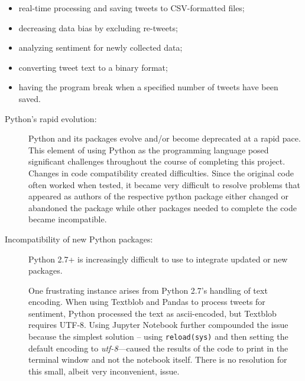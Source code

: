 \begin{itemize}	
\item real-time processing and saving tweets to CSV-formatted files;
\item decreasing data bias by excluding re-tweets;
\item analyzing sentiment for newly collected
data;
\item converting tweet text to a binary format;
\item having the program break when a specified
number of tweets have been saved.
\end{itemize}

\begin{description}
\item[Python's rapid evolution:] Python and its packages evolve and/or
  become deprecated at a rapid pace.  This element of using Python as
  the programming language posed significant challenges throughout the
  course of completing this project.  Changes in code compatibility
  created difficulties.  Since the original code often worked when
  tested, it became very difficult to resolve problems that appeared
  as authors of the respective python package either changed or
  abandoned the package while other packages needed to complete the
  code became incompatible.


\item[Incompatibility of new Python packages:] Python 2.7+ is
  increasingly difficult to use to integrate updated or new packages.


  One frustrating instance arises from Python 2.7's handling of text
  encoding.  When using Textblob and Pandas to process tweets for
  sentiment, Python processed the text as ascii-encoded, but Textblob
  requires UTF-8.  Using Jupyter Notebook further compounded the issue
  because the simplest solution – using \verb|reload(sys)| and then
  setting the default encoding to \emph{utf-8}—caused the results of
  the code to print in the terminal window and not the notebook
  itself.  There is no resolution for this small, albeit very
  inconvenient, issue.
 

\end{description}
